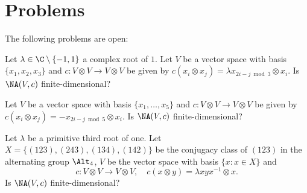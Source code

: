 \section{Problems}

\begin{prob}

\end{prob}

The following problems are open:

\begin{prob}
	Let $\lambda\in\C\setminus\{-1,1\}$ a complex root of $1$. Let $V$ be a
	vector space with basis $\{x_1,x_2,x_3\}$ and $c\colon V\otimes V\to
	V\otimes V$ be given by $c(x_i\otimes x_j)=\lambda x_{2i-j\bmod 3}\otimes
	x_i$.  Is $\NA(V,c)$ finite-dimensional?
\end{prob}

\begin{prob}
	Let $V$ be a vector space with basis $\{x_1,\dots,x_5\}$ and $c\colon
	V\otimes V\to V\otimes V$ be given by $c(x_i\otimes x_j)=-x_{2i-j\bmod
	5}\otimes x_i$.  Is $\NA(V,c)$ finite-dimensional?
\end{prob}

\begin{prob}
	Let $\lambda$ be a primitive third root of one.  Let
	$X=\{(123),(243),(134),(142)\}$ be the conjugacy class of $(123)$ in the
	alternating group $\Alt_4$, $V$ be the vector space with basis $\{x:x\in
	X\}$ and 
	\[
	c\colon V\otimes V\to V\otimes V,\quad
	c(x\otimes y)=\lambda xyx^{-1}\otimes x.
	\]
	Is $\NA(V,c)$ finite-dimensional?
\end{prob}

